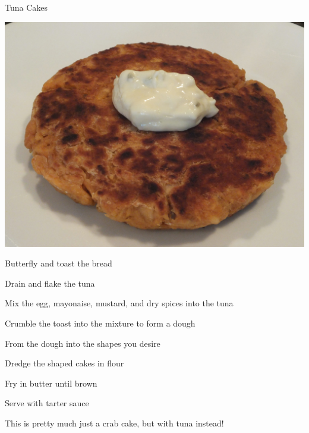 \documentclass{recipe}
\begin{document}
\begin{recipe}{Tuna Cakes}

  \begin{ingredients}
  \end{ingredients}

  \begin{images}
    \begin{image}
      \includegraphics[width=\linewidth,trim=100px 100px 100px 100px, clip=true]{tuna_cakes-01.jpeg}
    \end{image}
  \end{images}

  \begin{steps}
  \item Butterfly and toast the bread
  \item Drain and flake the tuna
  \item Mix the egg, mayonaise, mustard, and dry spices into the tuna
  \item Crumble the toast into the mixture to form a dough
  \item From the dough into the shapes you desire
  \item Dredge the shaped cakes in flour
  \item Fry in butter until brown
  \item Serve with tarter sauce
  \end{steps}

  \begin{notes}
  \item This is pretty much just a crab cake, but with tuna instead!
  \end{notes}
\end{recipe}
\end{document}
